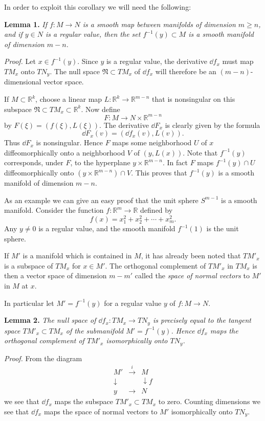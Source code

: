 In order to exploit this corollary we will need the following:

\noindent\textbf{Lemma 1.} \textit{If $f : M \to N$ is a smooth map between manifolds of dimension $m \geq n$, and if $y \in N$ is a regular value, then the set $f^{-1}(y) \subset M$ is a smooth manifold of dimension $m - n$.}

\noindent\textit{Proof.} Let $x \in f^{-1}(y)$. Since $y$ is a regular value, the derivative $\dd f_x$ must map $TM_x$ onto $TN_y$. The null space $\mathfrak{N} \subset TM_x$ of $\dd f_x$ will therefore be an $(m-n)$-dimensional vector space.

If $M \subset \mathbb{R}^k$, choose a linear map $L : \mathbb{R}^k \to \mathbb{R}^{m-n}$ that is nonsingular on this subspace $\mathfrak{N} \subset TM_x \subset \mathbb{R}^k$. Now define
\[
F : M \to N \times \mathbb{R}^{m-n}
\]
by $F(\xi) = (f(\xi), L(\xi))$. The derivative $\dd F_x$ is clearly given by the formula
\[
\dd F_x(v) = (\dd f_x(v), L(v)).
\]
Thus $\dd F_x$ is nonsingular. Hence $F$ maps some neighborhood $U$ of $x$ diffeomorphically onto a neighborhood $V$ of $(y, L(x))$. Note that $f^{-1}(y)$ corresponds, under $F$, to the hyperplane $y \times \mathbb{R}^{m-n}$. In fact $F$ maps $f^{-1}(y) \cap U$ diffeomorphically onto $(y \times \mathbb{R}^{m-n}) \cap V$. This proves that $f^{-1}(y)$ is a smooth manifold of dimension $m - n$.

As an example we can give an easy proof that the unit sphere $S^{m-1}$ is a smooth manifold. Consider the function $f : \mathbb{R}^m \to \mathbb{R}$ defined by
\[
f(x) = x_1^2 + x_2^2 + \cdots + x_m^2.
\]
Any $y \neq 0$ is a regular value, and the smooth manifold $f^{-1}(1)$ is the unit sphere.

If $M'$ is a manifold which is contained in $M$, it has already been noted that $TM'_x$ is a subspace of $TM_x$ for $x \in M'$. The orthogonal complement of $TM'_x$ in $TM_x$ is then a vector space of dimension $m - m'$ called the \emph{space of normal vectors} to $M'$ in $M$ at $x$.

In particular let $M' = f^{-1}(y)$ for a regular value $y$ of $f : M \to N$.



\noindent\textbf{Lemma 2.} \textit{The null space of $\dd f_x : TM_x \to TN_y$ is precisely equal to the tangent space $TM'_x \subset TM_x$ of the submanifold $M' = f^{-1}(y)$. Hence $\dd f_x$ maps the orthogonal complement of $TM'_x$ isomorphically onto $TN_y$.}

\noindent\textit{Proof.} From the diagram
\[
\begin{array}{ccc}
M' & \xrightarrow{i} & M \\
\downarrow & & \downarrow f \\
y & \longrightarrow & N
\end{array}
\]
we see that $\dd f_x$ maps the subspace $TM'_x \subset TM_x$ to zero. Counting dimensions we see that $\dd f_x$ maps the space of normal vectors to $M'$ isomorphically onto $TN_y$.

